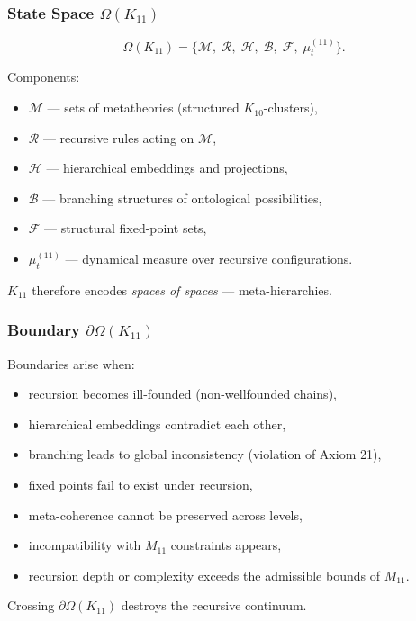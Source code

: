 \subsubsection{State Space $\Omega(K_{11})$}

\[
\Omega(K_{11})=
\{
\mathcal{M},\;
\mathcal{R},\;
\mathcal{H},\;
\mathcal{B},\;
\mathcal{F},\;
\mu^{(11)}_t
\}.
\]

Components:
\begin{itemize}
    \item $\mathcal{M}$ — sets of metatheories (structured $K_{10}$-clusters),
    \item $\mathcal{R}$ — recursive rules acting on $\mathcal{M}$,
    \item $\mathcal{H}$ — hierarchical embeddings and projections,
    \item $\mathcal{B}$ — branching structures of ontological possibilities,
    \item $\mathcal{F}$ — structural fixed-point sets,
    \item $\mu^{(11)}_t$ — dynamical measure over recursive configurations.
\end{itemize}

$K_{11}$ therefore encodes \emph{spaces of spaces} — meta-hierarchies.

\subsubsection{Boundary $\partial\Omega(K_{11})$}

Boundaries arise when:
\begin{itemize}
    \item recursion becomes ill-founded (non-wellfounded chains),
    \item hierarchical embeddings contradict each other,
    \item branching leads to global inconsistency (violation of Axiom 21),
    \item fixed points fail to exist under recursion,
    \item meta-coherence cannot be preserved across levels,
    \item incompatibility with $M_{11}$ constraints appears,
    \item recursion depth or complexity exceeds the admissible bounds of $M_{11}$.
\end{itemize}

Crossing $\partial\Omega(K_{11})$ destroys the recursive continuum.

